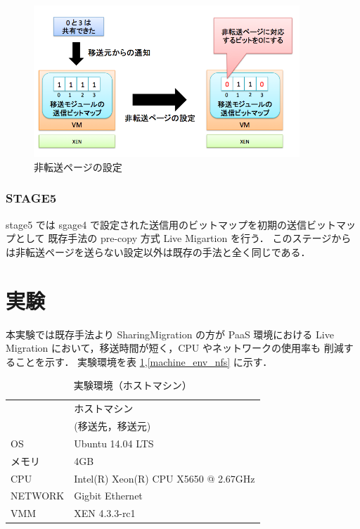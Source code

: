 \documentclass[graduation-thesis]{mlarticle}
\begin{document}
\begin{figure}[H]\begin{center}\includegraphics[width=10.0cm]{./img/non-sending.png}\caption{ 非転送ページの設定}\label{non-sending}\end{center}\end{figure}

\subsubsection{STAGE5}
\label{sec-5-3-5}
stage5 では sgage4 で設定された送信用のビットマップを初期の送信ビットマップとして
既存手法の pre-copy 方式 Live Migartion を行う．
このステージからは非転送ページを送らない設定以外は既存の手法と全く同じである．

\section{実験}
\label{sec-6}
本実験では既存手法より SharingMigration の方が PaaS 環境における
Live Migration において，移送時間が短く，CPU やネットワークの使用率も
削減することを示す．
実験環境を表 \ref{machine_env_host},\ref{machine_env_nfs} に示す．

\begin{table}[htb]
\caption{\label{machine_env_host}実験環境（ホストマシン）}
\centering
\begin{tabular}{|l|l|}
\hline
 & ホストマシン\\
 & (移送先，移送元)\\
\hline
OS & Ubuntu 14.04 LTS\\
\hline
メモリ & 4GB\\
\hline
CPU & Intel(R) Xeon(R) CPU X5650  @ 2.67GHz\\
\hline
NETWORK & Gigbit Ethernet\\
\hline
VMM & XEN 4.3.3-rc1\\
\hline
\end{tabular}
\end{table}
\end{document}
